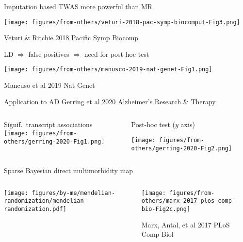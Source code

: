 \documentclass{beamer}
\begin{document}
\begin{frame}{Imputation based TWAS more powerful than MR}

\texttt{[image: figures/from-others/veturi-2018-pac-symp-biocomput-Fig3.png]}

\tiny{Veturi \& Ritchie 2018 Pacific Symp Biocomp}
\end{frame}

\begin{frame}{LD $\Rightarrow$ false positives $\Rightarrow$ need for post-hoc
	test}

\texttt{[image: figures/from-others/manusco-2019-nat-genet-Fig1.png]}

\tiny{Mancuso et al 2019 Nat Genet}
\end{frame}

\begin{frame}{Application to AD \tiny{Gerring et al 2020 Alzheimer's Research \& Therapy}}
\begin{columns}[t]
\begin{column}{0.5\textwidth}
Signif.~transcript associations\\

\texttt{[image: figures/from-others/gerring-2020-Fig1.png]}
\end{column}

\begin{column}{0.5\textwidth}
Post-hoc test ($y$ axis)

\texttt{[image: figures/from-others/gerring-2020-Fig2.png]}
\end{column}
\end{columns}
\end{frame}

\begin{frame}{Sparse Bayesian direct multimorbidity map}
\begin{columns}[t]
\begin{column}{0.25\textwidth}

\texttt{[image: figures/by-me/mendelian-randomization/mendelian-randomization.pdf]}
\end{column}

\begin{column}{0.75\textwidth}

\texttt{[image: figures/from-others/marx-2017-plos-comp-bio-Fig2c.png]}

\tiny{Marx, Antal, et al 2017 PLoS Comp Biol}
\end{column}
\end{columns}
\end{frame}
\end{document}
